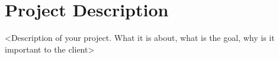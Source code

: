 \section{Project Description}
\label{sec:descr}
<Description of your project. What it is about, what is the goal, why is it important to the client>